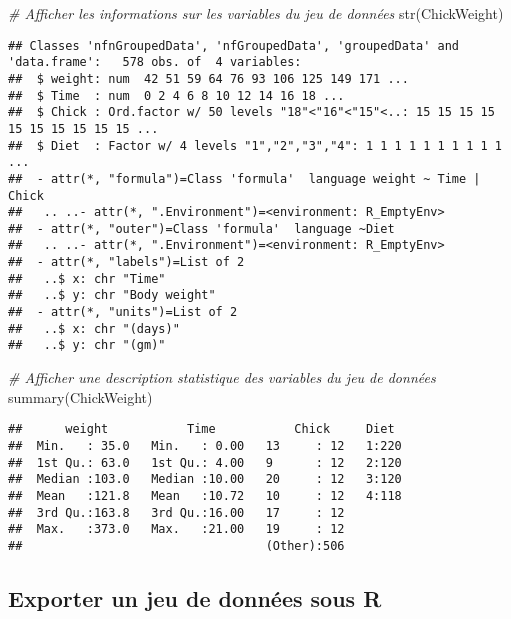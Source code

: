 \documentclass[
]{article}
\newenvironment{Shaded}{\begin{snugshade}}{\end{snugshade}}
\newcommand{\CommentTok}[1]{\textcolor[rgb]{0.56,0.35,0.01}{\textit{#1}}}
\newcommand{\FunctionTok}[1]{\textcolor[rgb]{0.00,0.00,0.00}{#1}}
\newcommand{\NormalTok}[1]{#1}
\begin{document}
\begin{Shaded}
\begin{Highlighting}[]
\CommentTok{\# Afficher les informations sur les variables du jeu de données}
\FunctionTok{str}\NormalTok{(ChickWeight)}
\end{Highlighting}
\end{Shaded}

\begin{verbatim}
## Classes 'nfnGroupedData', 'nfGroupedData', 'groupedData' and 'data.frame':   578 obs. of  4 variables:
##  $ weight: num  42 51 59 64 76 93 106 125 149 171 ...
##  $ Time  : num  0 2 4 6 8 10 12 14 16 18 ...
##  $ Chick : Ord.factor w/ 50 levels "18"<"16"<"15"<..: 15 15 15 15 15 15 15 15 15 15 ...
##  $ Diet  : Factor w/ 4 levels "1","2","3","4": 1 1 1 1 1 1 1 1 1 1 ...
##  - attr(*, "formula")=Class 'formula'  language weight ~ Time | Chick
##   .. ..- attr(*, ".Environment")=<environment: R_EmptyEnv> 
##  - attr(*, "outer")=Class 'formula'  language ~Diet
##   .. ..- attr(*, ".Environment")=<environment: R_EmptyEnv> 
##  - attr(*, "labels")=List of 2
##   ..$ x: chr "Time"
##   ..$ y: chr "Body weight"
##  - attr(*, "units")=List of 2
##   ..$ x: chr "(days)"
##   ..$ y: chr "(gm)"
\end{verbatim}

\begin{Shaded}
\begin{Highlighting}[]
\CommentTok{\# Afficher une description statistique des variables du jeu de données}
\FunctionTok{summary}\NormalTok{(ChickWeight)}
\end{Highlighting}
\end{Shaded}

\begin{verbatim}
##      weight           Time           Chick     Diet   
##  Min.   : 35.0   Min.   : 0.00   13     : 12   1:220  
##  1st Qu.: 63.0   1st Qu.: 4.00   9      : 12   2:120  
##  Median :103.0   Median :10.00   20     : 12   3:120  
##  Mean   :121.8   Mean   :10.72   10     : 12   4:118  
##  3rd Qu.:163.8   3rd Qu.:16.00   17     : 12          
##  Max.   :373.0   Max.   :21.00   19     : 12          
##                                  (Other):506
\end{verbatim}

\hypertarget{exporter-un-jeu-de-donnuxe9es-sous-r}{%
\subsection{Exporter un jeu de données sous R}\label{exporter-un-jeu-de-donnuxe9es-sous-r}}
\end{document}
